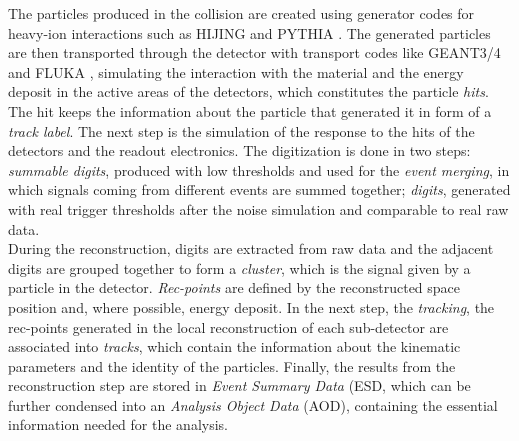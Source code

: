 The particles produced in the collision are created using generator codes for heavy-ion interactions such as HIJING \cite{hijing} and PYTHIA \cite{pythia}. The generated particles are  then transported through the detector with transport codes like GEANT3/4 \cite{geant} and FLUKA \cite{fluka}, simulating the interaction with the material and the energy deposit in the active areas of the detectors, which constitutes the particle \textit{hits}. The hit keeps the information about the particle that generated it in form of a \textit{track label}. The next step is the simulation of the response to the hits of the detectors and the readout electronics. The digitization is done in two steps: \textit{summable digits}, produced with low thresholds and used for the \textit{event merging}, in which signals coming from different events are summed together; \textit{digits}, generated with real trigger thresholds after the noise simulation and comparable to real raw data.\\
During the reconstruction, digits are extracted from raw data and the adjacent digits are grouped together to form  a \textit{cluster}, which is the signal given by a particle in the detector. \textit{Rec-points} are defined by the reconstructed space position and, where possible, energy deposit. In the next step, the \textit{tracking}, the rec-points generated in the local reconstruction of each sub-detector are associated into \textit{tracks}, which contain the information about the kinematic parameters and the identity of the particles. Finally, the results from the reconstruction step are stored in \textit{Event Summary Data} (ESD, which can be further condensed into an \textit{Analysis Object Data} (AOD), containing the essential information needed for the analysis.
